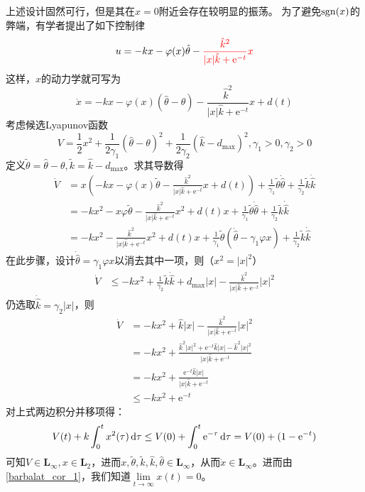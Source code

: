 上述设计固然可行，但是其在$x=0$附近会存在较明显的振荡。
为了避免$\operatorname{sgn}(x)$的弊端，有学者提出了如下控制律
\[u=-kx-\varphi(x)\hat{\theta}-\textcolor{red}{\frac{\hat{k}^2}{|x|\hat{k}+\mathrm{e}^{-t}}x}\]
这样，$x$的动力学就可写为
\[\dot{x}=-kx-\varphi(x)(\hat{\theta}-\theta)-\frac{\hat{k}^2}{|x|\hat{k}+\mathrm{e}^{-t}}x+d(t)\]
考虑候选Lyapunov函数
\[V=\frac{1}{2}x^2+\frac{1}{2\gamma_1}(\hat{\theta}-\theta)^2+\frac{1}{2\gamma_2}(\hat{k}-d_{\max})^2,\gamma_1>0,\gamma_2>0\]
定义$\tilde{\theta}=\hat{\theta}-\theta,\tilde{k}=\hat{k}-d_{\max}$。求其导数得
\begin{align*}
    \dot{V}&=x\left(-kx-\varphi(x)\tilde{\theta}-\frac{\hat{k}^2}{|x|\hat{k}+\mathrm{e}^{-t}}x+d(t)\right)+\frac{1}{\gamma_1}\tilde{\theta}\dot{\hat{\theta}}+\frac{1}{\gamma_2}\tilde{k}\dot{\hat{k}}\\
    &=-kx^2-x\varphi\tilde{\theta}-\frac{\hat{k}^2}{|x|\hat{k}+\mathrm{e}^{-t}}x^2+d(t)x+\frac{1}{\gamma_1}\tilde{\theta}\dot{\hat{\theta}}+\frac{1}{\gamma_2}\tilde{k}\dot{\hat{k}}\\
    &=-kx^2-\frac{\hat{k}^2}{|x|\hat{k}+\mathrm{e}^{-t}}x^2+d(t)x+\frac{1}{\gamma_1}\tilde{\theta}(\dot{\hat{\theta}}-\gamma_1\varphi x)+\frac{1}{\gamma_2}\tilde{k}\dot{\hat{k}}
\end{align*}
在此步骤，设计$\dot{\hat{\theta}}=\gamma_1\varphi x$以消去其中一项，则（$x^2=|x|^2$）
\begin{align*}
    \dot{V}&\leq -kx^2+\frac{1}{\gamma_2}\tilde{k}\dot{\hat{k}}+d_{\max}|x|-\frac{\hat{k}^2}{|x|\hat{k}+\mathrm{e}^{-t}}|x|^2
\end{align*}
仍选取$\dot{\hat{k}}=\gamma_2 |x|$，则
\begin{align*}
   \dot{V} &=-kx^2+{\hat{k}}|x|-\frac{\hat{k}^2}{|x|\hat{k}+\mathrm{e}^{-t}}|x|^2\\
    &=-kx^2+\frac{\hat{k}^2|x|^2+\mathrm{e}^{-t}\hat{k}|x|-\hat{k}^2|x|^2}{|x|\hat{k}+\mathrm{e}^{-t}}\\
    &=-kx^2+\frac{\mathrm{e}^{-t}\hat{k}|x|}{|x|\hat{k}+\mathrm{e}^{-t}}\\
    &\leq -kx^2+\mathrm{e}^{-t}
\end{align*}
对上式两边积分并移项得：
\[V(t)+k\int_{0}^{t} x^2(\tau)\mathop{}\!\mathrm{d}\tau\le V(0)+\int_{0}^{t} \mathrm{e}^{-\tau}\mathop{}\!\mathrm{d}\tau=V(0)+(1-\mathrm{e}^{-t})\]
可知$V\in\mathbf{L}_\infty,x\in\mathbf{L}_2$，进而$x,\tilde{\theta},\tilde{k},\hat{k},\hat{\theta}\in\mathbf{L}_\infty$，从而$\dot{x}\in\mathbf{L}_\infty$。进而由 \ref{barbalat_cor_1}，我们知道$\lim\limits_{t\to\infty}x(t)=0$。